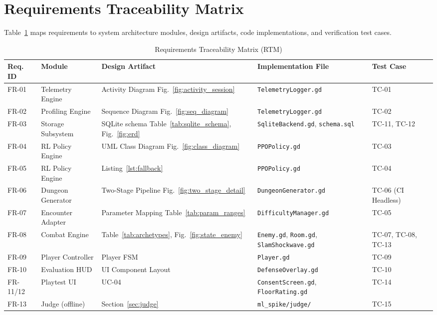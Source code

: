 \section{Requirements Traceability Matrix}
Table~\ref{tab:rtm} maps requirements to system architecture modules, design artifacts, code implementations, and verification test cases.

\begin{table}[!htbp]
\centering
\caption{Requirements Traceability Matrix (RTM)}
\label{tab:rtm}
\scriptsize
\begin{tabular}{p{}p{}p{}p{}p{}}
\toprule
\textbf{Req. ID} & \textbf{Module} & \textbf{Design Artifact} & \textbf{Implementation File} & \textbf{Test Case} \\
\midrule
FR-01 & Telemetry Engine & Activity Diagram Fig.~\ref{fig:activity_session} & \texttt{TelemetryLogger.gd} & TC-01 \\
FR-02 & Profiling Engine & Sequence Diagram Fig.~\ref{fig:seq_diagram} & \texttt{TelemetryLogger.gd} & TC-02 \\
FR-03 & Storage Subsystem & SQLite schema Table~\ref{tab:sqlite_schema}, Fig.~\ref{fig:erd} & \texttt{SqliteBackend.gd}, \texttt{schema.sql} & TC-11, TC-12 \\
FR-04 & RL Policy Engine & UML Class Diagram Fig.~\ref{fig:class_diagram} & \texttt{PPOPolicy.gd} & TC-03 \\
FR-05 & RL Policy Engine & Listing~\ref{lst:fallback} & \texttt{PPOPolicy.gd} & TC-04 \\
FR-06 & Dungeon Generator & Two-Stage Pipeline Fig.~\ref{fig:two_stage_detail} & \texttt{DungeonGenerator.gd} & TC-06 (CI Headless) \\
FR-07 & Encounter Adapter & Parameter Mapping Table~\ref{tab:param_ranges} & \texttt{DifficultyManager.gd} & TC-05 \\
FR-08 & Combat Engine & Table~\ref{tab:archetypes}, Fig.~\ref{fig:state_enemy} & \texttt{Enemy.gd}, \texttt{Room.gd}, \texttt{SlamShockwave.gd} & TC-07, TC-08, TC-13 \\
FR-09 & Player Controller & Player FSM & \texttt{Player.gd} & TC-09 \\
FR-10 & Evaluation HUD & UI Component Layout & \texttt{DefenseOverlay.gd} & TC-10 \\
FR-11/12 & Playtest UI & UC-04 & \texttt{ConsentScreen.gd}, \texttt{FloorRating.gd} & TC-14 \\
FR-13 & Judge (offline) & Section~\ref{sec:judge} & \texttt{ml\_spike/judge/} & TC-15 \\

\end{tabular}
\end{table}
